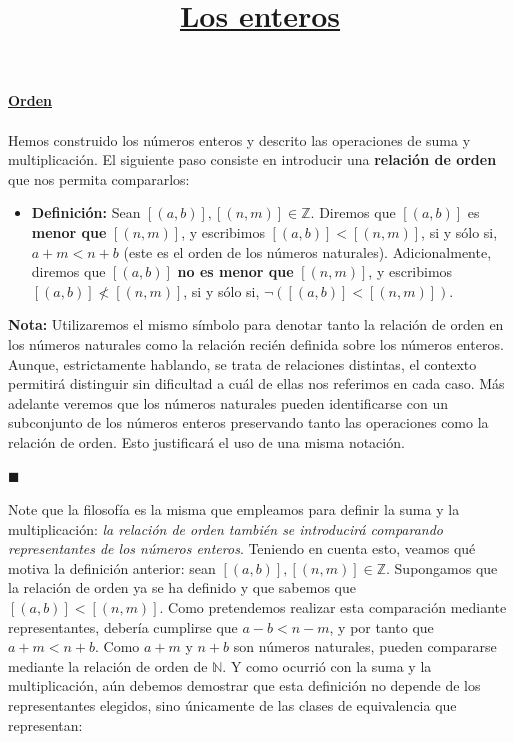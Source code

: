 \documentclass[10 pt]{article}
\title{\textbf{\underline{Los enteros}}}
\author{}
\date{}
\begin{document}
\pagestyle{empty}
\maketitle
\thispagestyle{empty}

\section*{}

\LARGE{\textbf{\underline{Orden}}}\\ \\

\Large{Hemos construido los números enteros y descrito las operaciones de suma y multiplicación. El siguiente paso consiste en introducir una \textbf{relación de orden} que nos permita compararlos:} \\

\begin{itemize}
    \item \Large{\textbf{Definición:} Sean $[(a,b)],[(n,m)] \in \mathbb Z$. Diremos que $[(a,b)]$ es \textbf{menor que} $[(n,m)]$, y escribimos \underline{$[(a,b)]<[(n,m)]$}, si y sólo si, $a+m<n+b$ (este es el orden de los números naturales). Adicionalmente, diremos que $[(a,b)]$ \textbf{no es menor que} $[(n,m)]$, y escribimos \underline{$[(a,b)] \nless [(n,m)]$}, si y sólo si, $\neg([(a,b)]<[(n,m)])$.} \\
\end{itemize}

\Large{\textbf{Nota:} Utilizaremos el mismo símbolo para denotar tanto la relación de orden en los números naturales como la relación recién definida sobre los números enteros. Aunque, estrictamente hablando, se trata de relaciones distintas, el contexto permitirá distinguir sin dificultad a cuál de ellas nos referimos en cada caso. Más adelante veremos que los números naturales pueden identificarse con un subconjunto de los números enteros preservando tanto las operaciones como la relación de orden. Esto justificará el uso de una misma notación.} \\

\begin{flushright}
   $\blacksquare$
\end{flushright}

\Large{Note que la filosofía es la misma que empleamos para definir la suma y la multiplicación: \textit{la relación de orden también se introducirá comparando representantes de los números enteros}. Teniendo en cuenta esto, veamos qué motiva la definición anterior: sean $[(a,b)],[(n,m)] \in \mathbb Z$. Supongamos que la relación de orden ya se ha definido y que sabemos que $[(a,b)]<[(n,m)]$. Como pretendemos realizar esta comparación mediante representantes, debería cumplirse que $a-b<n-m$, y por tanto que $a+m<n+b$. Como $a+m$ y $n+b$ son números naturales, pueden compararse mediante la relación de orden de $\mathbb N$. Y como ocurrió con la suma y la multiplicación, aún debemos demostrar que esta definición no depende de los representantes elegidos, sino únicamente de las clases de equivalencia que representan:} \\
\end{document}
